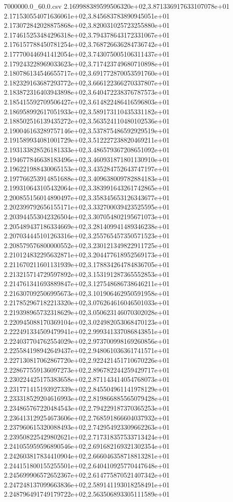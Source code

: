 \begin{filecontents*}{7000000.0_60.0.csv}
2.169988389599506320e+02,3.871336917633107078e+01
2.171530554071636061e+02,3.845683783890945051e+01
2.173072842028875868e+02,3.820031025723255880e+01
2.174615253484296318e+02,3.794378643172331067e+01
2.176157788450781254e+02,3.768726636284736742e+01
2.177700446941412054e+02,3.743075005106311437e+01
2.179243228969033623e+02,3.717423749680710898e+01
2.180786134546655717e+02,3.691772870053591760e+01
2.182329163687293772e+02,3.666122366270337807e+01
2.183872316403943898e+02,3.640472238376787573e+01
2.185415592709506427e+02,3.614822486416596803e+01
2.186958992617051933e+02,3.589173110435331182e+01
2.188502516139435272e+02,3.563524110480102536e+01
2.190046163289757146e+02,3.537875486592929519e+01
2.191589934081001729e+02,3.512227238820469211e+01
2.193133828526181333e+02,3.486579367208651092e+01
2.194677846638183496e+02,3.460931871801130910e+01
2.196221988430065153e+02,3.435284752643747197e+01
2.197766253914851688e+02,3.409638009782884183e+01
2.199310643105432064e+02,3.383991643261742865e+01
2.200855156014890497e+02,3.358345653126343677e+01
2.202399792656155171e+02,3.332700039423525595e+01
2.203944553042326504e+02,3.307054802195671073e+01
2.205489437186334669e+02,3.281409941489346238e+01
2.207034445101263316e+02,3.255765457350571523e+01
2.208579576800000552e+02,3.230121349822911725e+01
2.210124832295632871e+02,3.204477618952569173e+01
2.211670211601131939e+02,3.178834264784836705e+01
2.213215714729597892e+02,3.153191287365552853e+01
2.214761341693889847e+02,3.127548686738646211e+01
2.216307092506995673e+02,3.101906462950591958e+01
2.217852967182213320e+02,3.076264616046501033e+01
2.219398965732318629e+02,3.050623146070302028e+01
2.220945088170369104e+02,3.024982053068470123e+01
2.222491334509479941e+02,2.999341337086843851e+01
2.224037704762554029e+02,2.973700998169260856e+01
2.225584198942649437e+02,2.948061036361741571e+01
2.227130817062867720e+02,2.922421451710670226e+01
2.228677559136097273e+02,2.896782244259429717e+01
2.230224425175383658e+02,2.871143414054768073e+01
2.231771415193927339e+02,2.845504961141978129e+01
2.233318529204616993e+02,2.819866885565079428e+01
2.234865767220484543e+02,2.794229187370365253e+01
2.236413129254673606e+02,2.768591866604037932e+01
2.237960615320088493e+02,2.742954923309662263e+01
2.239508225429802621e+02,2.717318357533713424e+01
2.241055959596890546e+02,2.691682169321302354e+01
2.242603817834410904e+02,2.666046358718813281e+01
2.244151800155255501e+02,2.640410925770447648e+01
2.245699906572652367e+02,2.614775870521407342e+01
2.247248137099663836e+02,2.589141193018258491e+01
2.248796491749179722e+02,2.563506893305111589e+01

\end{filecontents*}
